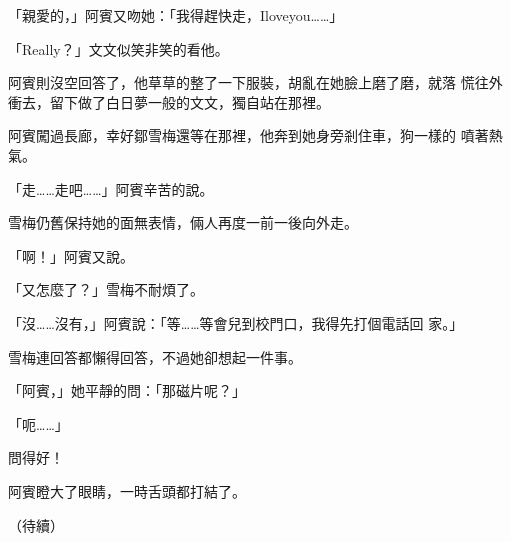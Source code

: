 「親愛的，」阿賓又吻她：「我得趕快走，Iloveyou……」

「Really？」文文似笑非笑的看他。

阿賓則沒空回答了，他草草的整了一下服裝，胡亂在她臉上磨了磨，就落
慌往外衝去，留下做了白日夢一般的文文，獨自站在那裡。

阿賓闖過長廊，幸好鄒雪梅還等在那裡，他奔到她身旁剎住車，狗一樣的
噴著熱氣。

「走……走吧……」阿賓辛苦的說。

雪梅仍舊保持她的面無表情，倆人再度一前一後向外走。

「啊！」阿賓又說。

「又怎麼了？」雪梅不耐煩了。

「沒……沒有，」阿賓說：「等……等會兒到校門口，我得先打個電話回
家。」

雪梅連回答都懶得回答，不過她卻想起一件事。

「阿賓，」她平靜的問：「那磁片呢？」

「呃……」

問得好！

阿賓瞪大了眼睛，一時舌頭都打結了。

（待續）










